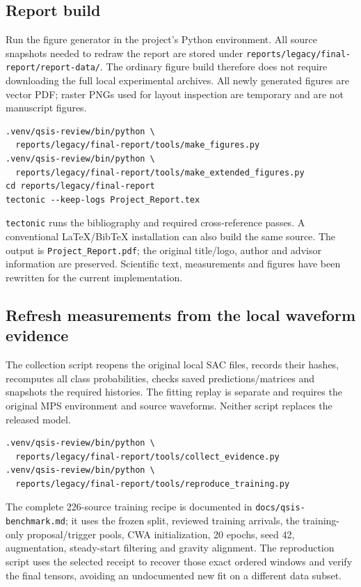 \documentclass[a4paper,11pt,oneside]{article}
\newcommand{\code}[1]{\nolinkurl{#1}}
\begin{document}
\subsection{Report build}
Run the figure generator in the project's Python environment. All source
snapshots needed to redraw the report are stored under
\code{reports/legacy/final-report/report-data/}. The ordinary figure build
therefore does not require downloading the full local experimental archives.
All newly generated figures are vector PDF; raster PNGs used for layout
inspection are temporary and are not manuscript figures.
\begin{lstlisting}
.venv/qsis-review/bin/python \
  reports/legacy/final-report/tools/make_figures.py
.venv/qsis-review/bin/python \
  reports/legacy/final-report/tools/make_extended_figures.py
cd reports/legacy/final-report
tectonic --keep-logs Project_Report.tex
\end{lstlisting}
\code{tectonic} runs the bibliography and required cross-reference passes.
A conventional LaTeX/BibTeX installation can also build the same source.
The output is \code{Project_Report.pdf}; the original title/logo, author and
advisor information are preserved. Scientific text, measurements and figures
have been rewritten for the current implementation.

\subsection{Refresh measurements from the local waveform evidence}
The collection script reopens the original local SAC files, records their
hashes, recomputes all class probabilities, checks saved predictions/matrices
and snapshots the required histories. The fitting replay is separate and
requires the original MPS environment and source waveforms. Neither script
replaces the released model.
\begin{lstlisting}
.venv/qsis-review/bin/python \
  reports/legacy/final-report/tools/collect_evidence.py
.venv/qsis-review/bin/python \
  reports/legacy/final-report/tools/reproduce_training.py
\end{lstlisting}

The complete 226-source training recipe is documented in
\code{docs/qsis-benchmark.md}; it uses the frozen split, reviewed training
arrivals, the training-only proposal/trigger pools, CWA initialization,
20 epochs, seed 42, augmentation, steady-start filtering and gravity alignment.
The reproduction script uses the selected receipt to recover those exact
ordered windows and verify the final tensors, avoiding an undocumented new
fit on a different data subset.
\end{document}
